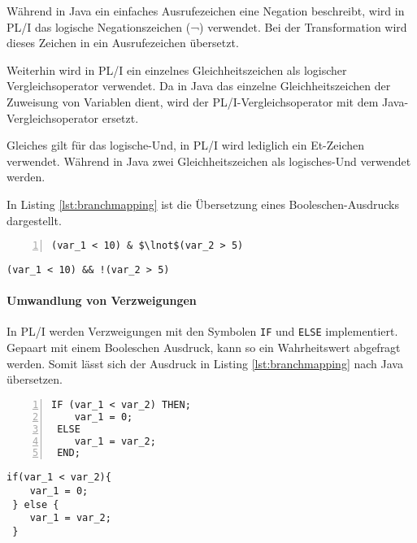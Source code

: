 Während in Java ein einfaches Ausrufezeichen eine Negation beschreibt, wird in PL/I das logische Negationszeichen (¬) verwendet. Bei der Transformation wird dieses Zeichen in ein Ausrufezeichen übersetzt.

Weiterhin wird in PL/I ein einzelnes Gleichheitszeichen als logischer Vergleichsoperator verwendet. Da in Java das einzelne Gleichheitszeichen der Zuweisung von Variablen dient, wird der PL/I-Vergleichsoperator mit dem Java-Vergleichsoperator ersetzt.

Gleiches gilt für das logische-Und, in PL/I wird lediglich ein Et-Zeichen verwendet. Während in Java zwei Gleichheitszeichen als logisches-Und verwendet werden.

In Listing \ref{lst:branchmapping} ist die Übersetzung eines Booleschen-Ausdrucks dargestellt.

\begin{minipage}[b]{0.48\linewidth}
	\centering
	\lstset{language=PL/I,label=SliceExaple}
	\begin{lstlisting}[frame=single, numbers=left, mathescape,%
		caption={Boolescher-Ausdruck}, label={lst:branchmapping}]	
 (var_1 < 10) & $\lnot$(var_2 > 5)
	\end{lstlisting}
\end{minipage}
\hspace{0.5cm}
\begin{minipage}[b]{0.48\linewidth}
	\centering
	\lstset{language=Java,label=SliceExaple}
	\begin{lstlisting}[frame=single, mathescape,%
		title={" "}]
 (var_1 < 10) && !(var_2 > 5)
	\end{lstlisting}
\end{minipage}
\pagebreak

\paragraph*{Umwandlung von Verzweigungen}

In PL/I werden Verzweigungen mit den Symbolen \verb+IF+ und \verb+ELSE+ implementiert. 
Gepaart mit einem Booleschen Ausdruck, kann so ein Wahrheitswert abgefragt werden.
Somit lässt sich der Ausdruck in Listing \ref{lst:branchmapping} nach Java übersetzen.

\begin{minipage}[b]{0.48\linewidth}
	\centering
	\lstset{language=PL/I,label=SliceExaple}
	\begin{lstlisting}[frame=single, numbers=left, mathescape,%
		caption={Transformation Verzweigungen}, label={lst:branchmapping}]	
 IF (var_1 < var_2) THEN;
 	var_1 = 0;
 ELSE
 	var_1 = var_2;
 END;
	\end{lstlisting}
\end{minipage}
\hspace{0.5cm}
\begin{minipage}[b]{0.48\linewidth}
	\centering
	\lstset{language=Java,label=SliceExaple}
	\begin{lstlisting}[frame=single, mathescape,%
		title={" "}]
 if(var_1 < var_2){
 	var_1 = 0;	
 } else {
	var_1 = var_2;
 }
	\end{lstlisting}
\end{minipage} 

